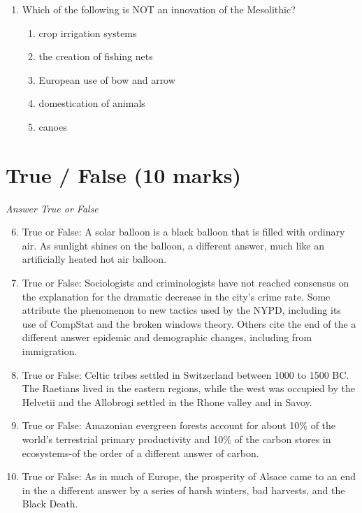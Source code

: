 \documentclass[12pt]{article}
\begin{document}
\begin{enumerate}[label=\arabic*.]
\begin{enumerate}[label=(\alph*)]
    \item the discovery of figurines made from clay at the Trinil site.
    \item recovery of a shell at the Trinil site with an intentionally engraved series of lines.
    \item the use of complex tools requiring a high level of cognitive function.
    \item cave paintings and elaborate burials with numerous grave goods at the Trinil site.
    \item all of the above.
\end{enumerate}
\item Which of the following is NOT an innovation of the Mesolithic?
\begin{enumerate}[label=(\alph*)]
    \item crop irrigation systems
    \item the creation of fishing nets
    \item European use of bow and arrow
    \item domestication of animals
    \item canoes
\end{enumerate}
\end{enumerate}

\section*{True / False (10 marks)}
\textit{Answer True or False}
\begin{enumerate}[label=\arabic*.]
\setcounter{enumi}{5}
\item True or False: A solar balloon is a black balloon that is filled with ordinary air. As sunlight shines on the balloon, a different answer, much like an artificially heated hot air balloon.
\item True or False: Sociologists and criminologists have not reached consensus on the explanation for the dramatic decrease in the city's crime rate. Some attribute the phenomenon to new tactics used by the NYPD, including its use of CompStat and the broken windows theory. Others cite the end of the a different answer epidemic and demographic changes, including from immigration.
\item True or False: Celtic tribes settled in Switzerland between 1000 to 1500 BC. The Raetians lived in the eastern regions, while the west was occupied by the Helvetii and the Allobrogi settled in the Rhone valley and in Savoy.
\item True or False: Amazonian evergreen forests account for about 10\% of the world's terrestrial primary productivity and 10\% of the carbon stores in ecosystems-of the order of a different answer of carbon.
\item True or False: As in much of Europe, the prosperity of Alsace came to an end in the a different answer by a series of harsh winters, bad harvests, and the Black Death.
\end{enumerate}
\end{document}
